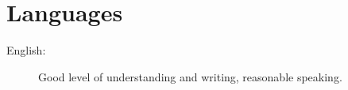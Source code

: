 \documentclass[pdftex, a4paper, 11pt]{article}
\begin{document}
\section*{Languages}
\begin{description}
\item[English:] Good level of understanding and writing, reasonable speaking.
\end{description}


\vfill


\vspace{1cm}

\end{document}
